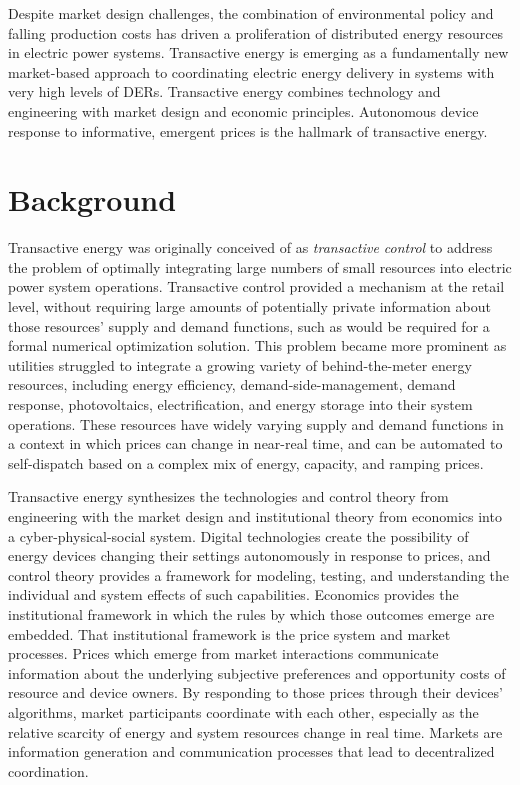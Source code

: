 Despite market design challenges, the combination of environmental policy and falling production costs has driven a proliferation of distributed energy resources in electric power systems. Transactive energy is emerging as a fundamentally new market-based approach to coordinating electric energy delivery in systems with very high levels of DERs. Transactive energy combines technology and engineering with market design and economic principles. Autonomous device response to informative, emergent prices is the hallmark of transactive energy.  

\section{Background}

Transactive energy was originally conceived of as \textit{transactive control} to address the problem of optimally integrating large numbers of small resources into electric power system operations. Transactive control provided a mechanism at the retail level, without requiring large amounts of potentially private information about those resources' supply and demand functions, such as would be required for a formal numerical optimization solution.  This problem became more prominent as utilities struggled to integrate a growing variety of behind-the-meter energy resources, including energy efficiency, demand-side-management, demand response, photovoltaics, electrification, and energy storage into their system operations.  These resources have widely varying supply and demand functions in a context in which prices can change in near-real time, and can be automated to self-dispatch based on a complex mix of energy, capacity, and ramping prices.

Transactive energy synthesizes the technologies and control theory from engineering with the market design and institutional theory from economics into a cyber-physical-social system. Digital technologies create the possibility of energy devices changing their settings autonomously in response to prices, and control theory provides a framework for modeling, testing, and understanding the individual and system effects of such capabilities. Economics provides the institutional framework in which the rules by which those outcomes emerge are embedded. That institutional framework is the price system and market processes. Prices which emerge from market interactions communicate information about the underlying subjective preferences and opportunity costs of resource and device owners. By responding to those prices through their devices' algorithms, market participants coordinate with each other, especially as the relative scarcity of energy and system resources change in real time. Markets are information generation and communication processes that lead to decentralized coordination.

